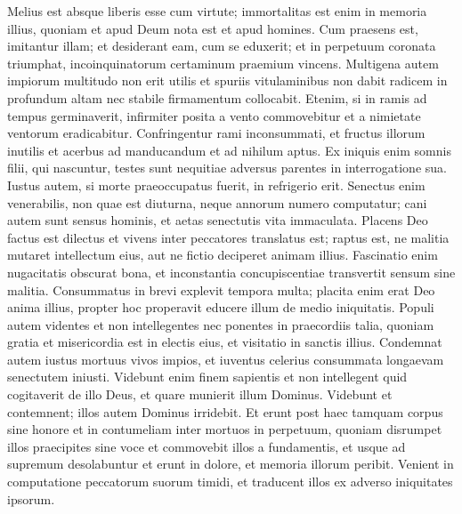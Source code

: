\begin{biblechapter}
\begin{biblechapter}
\begin{biblechapter}
\begin{biblechapter}
\verse Melius est absque liberis esse cum virtute;
 immortalitas est enim in memoria illius,
 quoniam et apud Deum nota est et apud homines.
 \verse Cum praesens est, imitantur illam;
 et desiderant eam, cum se eduxerit;
 et in perpetuum coronata triumphat,
 incoinquinatorum certaminum praemium vincens.
 \verse Multigena autem impiorum multitudo non erit utilis
 et spuriis vitulaminibus non dabit radicem in profundum altam
 nec stabile firmamentum collocabit.
 \verse Etenim, si in ramis ad tempus germinaverit,
 infirmiter posita a vento commovebitur
 et a nimietate ventorum eradicabitur.
 \verse Confringentur rami inconsummati,
 et fructus illorum inutilis et acerbus ad manducandum
 et ad nihilum aptus.
 \verse Ex iniquis enim somnis filii, qui nascuntur,
 testes sunt nequitiae adversus parentes
 in interrogatione sua.
 \verse Iustus autem, si morte praeoccupatus fuerit,
 in refrigerio erit.
 \verse Senectus enim venerabilis, non quae est diuturna,
 neque annorum numero computatur;
 \verse cani autem sunt sensus hominis,
 et aetas senectutis vita immaculata.
 \verse Placens Deo factus est dilectus
 et vivens inter peccatores translatus est;
 \verse raptus est, ne malitia mutaret intellectum eius,
 aut ne fictio deciperet animam illius.
 \verse Fascinatio enim nugacitatis obscurat bona,
 et inconstantia concupiscentiae transvertit sensum sine malitia.
 \verse Consummatus in brevi
 explevit tempora multa;
 \verse placita enim erat Deo anima illius,
 propter hoc properavit educere illum de medio iniquitatis.
 Populi autem videntes et non intellegentes
 nec ponentes in praecordiis talia,
 \verse quoniam gratia et misericordia est in electis eius,
 et visitatio in sanctis illius.
 \verse Condemnat autem iustus mortuus vivos impios,
 et iuventus celerius consummata longaevam senectutem iniusti.
 \verse Videbunt enim finem sapientis
 et non intellegent quid cogitaverit de illo Deus,
 et quare munierit illum Dominus.
 \verse Videbunt et contemnent;
 illos autem Dominus irridebit.
 \verse Et erunt post haec tamquam corpus sine honore
 et in contumeliam inter mortuos in perpetuum,
 quoniam disrumpet illos praecipites sine voce
 et commovebit illos a fundamentis, et usque ad supremum desolabuntur
 et erunt in dolore,
 et memoria illorum peribit.
 \verse Venient in computatione peccatorum suorum timidi,
 et traducent illos ex adverso iniquitates ipsorum.
 

\end{biblechapter}
\end{biblechapter}
\end{biblechapter}
\end{biblechapter}
